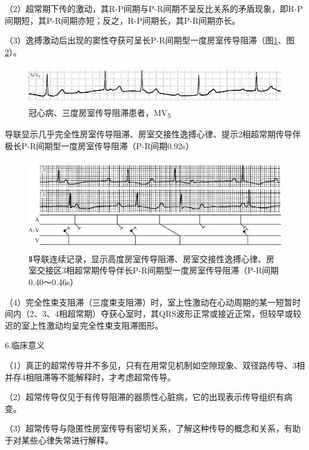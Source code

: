 （2）超常期下传的激动，其R-P间期与P-R间期不呈反比关系的矛盾现象，即R-P间期短，其P-R间期亦短；反之，R-P间期长，其P-R间期亦长。

（3）逸搏激动后出现的窦性夺获可呈长P-R间期型一度房室传导阻滞（图\ref{fig28-6}、图\ref{fig28-7}）。

\begin{figure}[!htbp]
 \centering
 \includegraphics[width=5.58333in,height=0.66667in]{./images/Image00466.jpg}
 \captionsetup{justification=centering}
 \caption{冠心病、三度房室传导阻滞患者，MV\textsubscript{5}}
 \label{fig28-6}
  \end{figure} 
导联显示几乎完全性房室传导阻滞、房室交接性逸搏心律、提示2相超常期传导伴极长P-R间期型一度房室传导阻滞（P-R间期0.92s）

\begin{figure}[!htbp]
 \centering
 \includegraphics[width=5.04167in,height=1.58333in]{./images/Image00467.jpg}
 \captionsetup{justification=centering}
 \caption{Ⅱ导联连续记录，显示高度房室传导阻滞、房室交接性逸搏心律、房室交接区3相超常期传导伴长P-R间期型一度房室传导阻滞（P-R间期0.40～0.46s）}
 \label{fig28-7}
  \end{figure} 

（4）完全性束支阻滞（三度束支阻滞）时，室上性激动在心动周期的某一短暂时间内（2、3、4相超常期）夺获心室时，其QRS波形正常或接近正常，但较早或较迟的室上性激动均呈完全性束支阻滞图形。

6.临床意义

（1）真正的超常传导并不多见，只有在用常见机制如空隙现象、双径路传导、3相并存4相阻滞等不能解释时，才考虑超常传导。

（2）超常传导仅见于有传导阻滞的器质性心脏病，它的出现表示传导组织有病变。

（3）超常传导与隐匿性房室传导有密切关系，了解这种传导的概念和关系，有助于对某些心律失常进行解释。

\protect\hypertarget{text00035.htmlux5cux23subid417}{}{}

